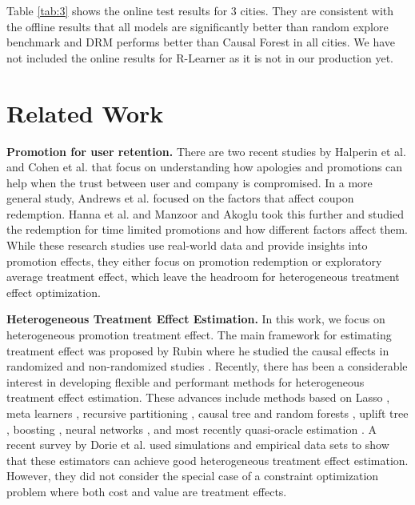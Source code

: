 Table \ref{tab:3} shows the online test results for 3 cities. They are consistent with the offline results that all models are significantly better than random explore benchmark and DRM performs better than Causal Forest in all cities. We have not included the online results for R-Learner as it is not in our production yet.


\section{Related Work}
\textbf{Promotion for user retention.} There are two recent studies by Halperin et al. \cite{halperin2018toward} and Cohen et al. \cite{cohen2018frustration}  that focus on understanding how apologies and promotions can help when the trust between user and company is compromised. In a more general study, Andrews et al. \cite{andrews2016mobile} focused on the factors that affect coupon redemption. Hanna et al. \cite{hanna2016optimizing} and Manzoor and Akoglu \cite{Manzoor2017RUSHTT} took this further and studied the redemption for time limited promotions and how different factors affect them. While these research studies use real-world data and provide insights into promotion effects, they either focus on promotion redemption or exploratory average treatment effect, which leave the headroom for heterogeneous treatment effect optimization.

\textbf{Heterogeneous Treatment Effect Estimation.} In this work, we focus on heterogeneous promotion treatment effect. The main framework for estimating treatment effect was proposed by Rubin where he studied the causal effects in randomized and non-randomized studies \cite{rubin1974estimating}. Recently, there has been a considerable interest in developing flexible and performant methods for heterogeneous treatment effect estimation. These advances include methods based on Lasso \cite{imai2013estimating}, meta learners \cite{kunzel2017meta}, recursive partitioning \cite{athey2016recursive}, causal tree and random forests \cite{wager2017estimation}, uplift tree \cite{rzepakowski2012decision}, boosting \cite{powers2017some}, neural networks \cite{louizos2017causal}, and most recently quasi-oracle estimation \cite{nie2017quasi}. A recent survey by Dorie et al. \cite{dorie2017automated} used  simulations and empirical data sets to show that these estimators can achieve good heterogeneous treatment effect estimation. However, they did not consider the special case of a constraint optimization problem where both cost and value are treatment effects.

